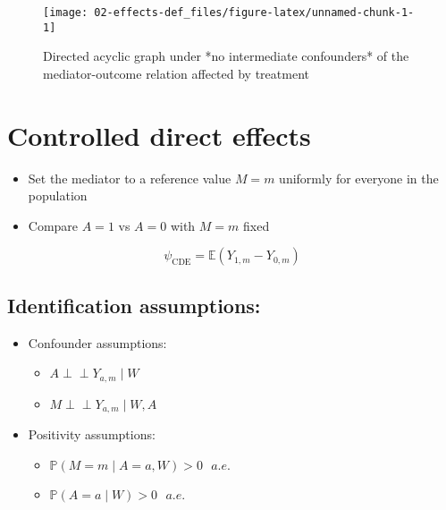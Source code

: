 \documentclass[
  12pt,
]{book}
\providecommand{\tightlist}{%
  \setlength{\itemsep}{0pt}\setlength{\parskip}{0pt}}
\theoremstyle{definition}
\theoremstyle{definition}
\theoremstyle{definition}
\newcommand{\indep}{\mbox{$\perp\!\!\!\perp$}}
\renewcommand{\P}{\mathbb{P}}
\newcommand{\E}{\mathbb{E}}
\newcommand{\1}{\mathbbm{1}}
\begin{document}
\begin{figure}

{\centering \texttt{[image: 02-effects-def\_files/figure-latex/unnamed-chunk-1-1]} 

}

\caption{Directed acyclic graph under *no intermediate confounders* of the mediator-outcome relation affected by treatment}\label{fig:unnamed-chunk-1}
\end{figure}

\hypertarget{controlled-direct-effects}{%
\section{Controlled direct effects}\label{controlled-direct-effects}}

\begin{itemize}
\tightlist
\item
  Set the mediator to a reference value \(M=m\) uniformly for everyone in the population
\item
  Compare \(A=1\) vs \(A=0\) with \(M=m\) fixed
\end{itemize}

\[\psi_{\text{CDE}} = \E(Y_{1,m} - Y_{0,m}) \]

\hypertarget{identification-assumptions}{%
\subsection{Identification assumptions:}\label{identification-assumptions}}

\begin{itemize}
\tightlist
\item
  Confounder assumptions:

  \begin{itemize}
  \tightlist
  \item
    \(A \indep Y_{a,m} \mid W\)
  \item
    \(M \indep Y_{a,m} \mid W, A\)
  \end{itemize}
\item
  Positivity assumptions:

  \begin{itemize}
  \tightlist
  \item
    \(\P(M = m \mid A=a, W) > 0 \text{  } a.e.\)
  \item
    \(\P(A=a \mid W) > 0 \text{  } a.e.\)
  \end{itemize}
\end{itemize}
\end{document}
